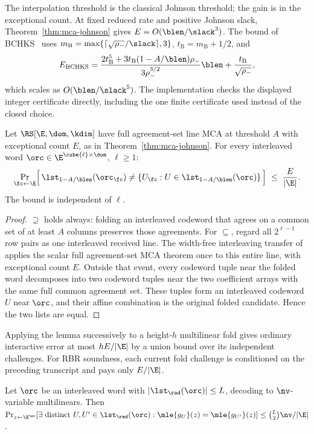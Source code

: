 The interpolation threshold is the classical Johnson threshold; the gain is in the exceptional count. At fixed reduced rate and positive Johnson slack, Theorem~\ref{thm:mca-johnson} gives $E=O(\blen/\slack^3)$. The bound of BCHKS~\cite[Thm.~4.6]{BCHKS25} uses $m_{\mathrm B}=\max\{\lceil\sqrt{\rho_-}/\slack\rceil,3\}$, $t_{\mathrm B}=m_{\mathrm B}+1/2$, and
\[
 E_{\mathrm{BCHKS}}=\frac{2t_{\mathrm B}^5+3t_{\mathrm B}(1-A/\blen)\rho_-}{3\rho_-^{3/2}}\blen+\frac{t_{\mathrm B}}{\sqrt{\rho_-}},
\]
which scales as $O(\blen/\slack^5)$. The implementation checks the displayed integer certificate directly, including the one finite certificate used instead of the closed choice.

\begin{lemma}\label{lem:fold-list}
Let $\RS[\E,\dom,\kdim]$ have full agreement-set line MCA at threshold $A$ with exceptional count $E$, as in Theorem~\ref{thm:mca-johnson}. For every interleaved word $\orc \in \E^{\cube{\ell} \times \dom}$, $\ell \ge 1$:
\[
\Pr_{\fc \leftarrow \E}\Bigl[\, \lst_{1-A/\blen}(\orc_\fc) \neq \{ U_\fc : U \in \lst_{1-A/\blen}(\orc) \} \,\Bigr] \;\le\; \frac{E}{|\E|} .
\]
The bound is independent of $\ell$.
\end{lemma}

\begin{proof}
$\supseteq$ holds always: folding an interleaved codeword that agrees on a common set of at least $A$ columns preserves those agreements. For $\subseteq$, regard all $2^{\ell-1}$ row pairs as one interleaved received line. The width-free interleaving transfer of~\cite{DKT26} applies the scalar full agreement-set MCA theorem once to this entire line, with exceptional count $E$. Outside that event, every codeword tuple near the folded word decomposes into two codeword tuples near the two coefficient arrays with the same full common agreement set. These tuples form an interleaved codeword $U$ near $\orc$, and their affine combination is the original folded candidate. Hence the two lists are equal.
\end{proof}

Applying the lemma successively to a height-$h$ multilinear fold gives ordinary interactive error at most $hE/|\E|$ by a union bound over its independent challenges. For RBR soundness, each current fold challenge is conditioned on the preceding transcript and pays only $E/|\E|$.

\begin{lemma}\label{lem:ood}
Let $\orc$ be an interleaved word with $|\lst_\rad(\orc)| \le L$, decoding to $\nv$-variable multilinears. Then $\Pr_{z \leftarrow \E^{\nv}}[\exists \text{ distinct } U, U' \in \lst_\rad(\orc) : \mle{g_U}(z) = \mle{g_{U'}}(z)] \le \binom{L}{2} \nv / |\E|$.
\end{lemma}

